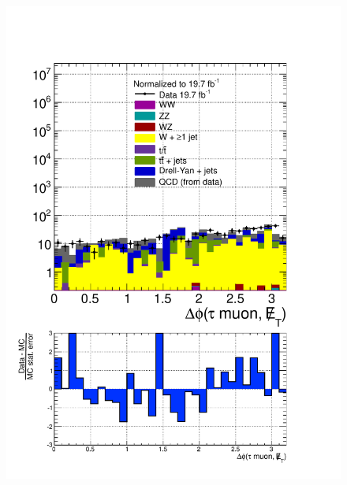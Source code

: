 \begin{figure}[hbtp]
  \begin{center}
    \includegraphics[width=\cmsFigWidth]{figures/dataVsMCQCD_dPhiTauMuMET_lowMT_v87}

\end{center}
\end{figure}
